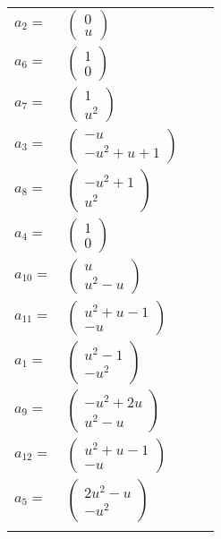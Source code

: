 \documentclass[1p]{elsarticle_modified}
\theoremstyle{definition}
\begin{document}
\begin{tabular}{m{7pt} m{180pt} m{7pt} m{180pt} }
\flushright $a_{2}=$&$\begin{pmatrix}0\\u\end{pmatrix}$ \\
\flushright $a_{6}=$&$\begin{pmatrix}1\\0\end{pmatrix}$ \\
\flushright $a_{7}=$&$\begin{pmatrix}1\\u^2\end{pmatrix}$ \\
\flushright $a_{3}=$&$\begin{pmatrix}- u\\- u^2+u+1\end{pmatrix}$ \\
\flushright $a_{8}=$&$\begin{pmatrix}- u^2+1\\u^2\end{pmatrix}$ \\
\flushright $a_{4}=$&$\begin{pmatrix}1\\0\end{pmatrix}$ \\
\flushright $a_{10}=$&$\begin{pmatrix}u\\u^2- u\end{pmatrix}$ \\
\flushright $a_{11}=$&$\begin{pmatrix}u^2+u-1\\- u\end{pmatrix}$ \\
\flushright $a_{1}=$&$\begin{pmatrix}u^2-1\\- u^2\end{pmatrix}$ \\
\flushright $a_{9}=$&$\begin{pmatrix}- u^2+2 u\\u^2- u\end{pmatrix}$ \\
\flushright $a_{12}=$&$\begin{pmatrix}u^2+u-1\\- u\end{pmatrix}$ \\
\flushright $a_{5}=$&$\begin{pmatrix}2 u^2- u\\- u^2\end{pmatrix}$\\&\end{tabular}
\end{document}
